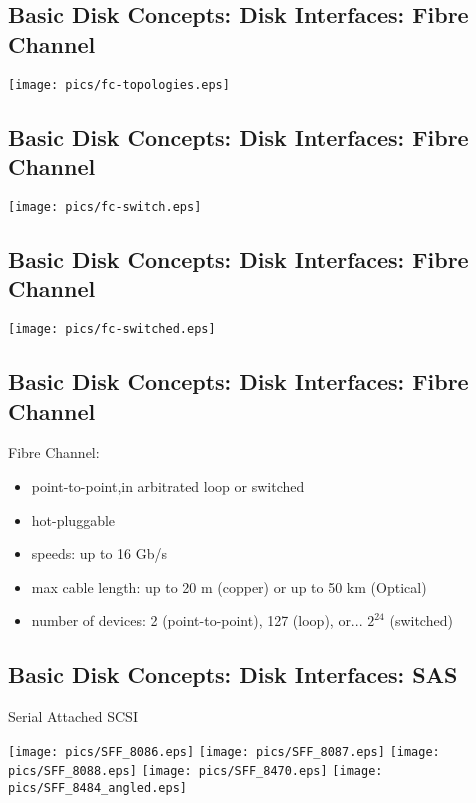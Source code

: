 \documentclass[xga]{xdvislides}
\begin{document}
\subsection{Basic Disk Concepts: Disk Interfaces: Fibre Channel}
\vfill
	\begin{center}
		\texttt{[image: pics/fc-topologies.eps]} \\
	\end{center}
\vfill

\subsection{Basic Disk Concepts: Disk Interfaces: Fibre Channel}
\vfill
	\begin{center}
		\texttt{[image: pics/fc-switch.eps]} \\
	\end{center}
\vfill

\subsection{Basic Disk Concepts: Disk Interfaces: Fibre Channel}
\vfill
	\begin{center}
		\texttt{[image: pics/fc-switched.eps]} \\
	\end{center}
\vfill

\subsection{Basic Disk Concepts: Disk Interfaces: Fibre Channel}
Fibre Channel:
\begin{itemize}
	\item point-to-point,in arbitrated loop or switched
	\item hot-pluggable
	\item speeds: up to 16  Gb/s
	\item max cable length: up to 20 m (copper) or up to 50 km (Optical)
	\item number of devices: 2 (point-to-point), 127 (loop), or... $2^{24}$ (switched)
\end{itemize}

\subsection{Basic Disk Concepts: Disk Interfaces: SAS}
Serial Attached SCSI
\vfill
\begin{center}
	\texttt{[image: pics/SFF\_8086.eps]}
	\texttt{[image: pics/SFF\_8087.eps]}
	\texttt{[image: pics/SFF\_8088.eps]}
	\texttt{[image: pics/SFF\_8470.eps]}
	\texttt{[image: pics/SFF\_8484\_angled.eps]}
\end{center}
\vfill
\end{document}
